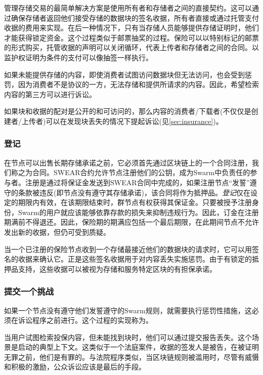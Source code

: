 管理存储交易的最简单解决方案是使用所有者和存储者之间的直接契约。这可以通过确保存储者返回他们接受存储的数据块的签名收据，所有者直接或通过托管支付收据的费用来实现。在后一种情况下，只有当存储人员能够提供存储证明时，他们才能获得锁定资金。这个过程类似于邮票抽奖的过程。保险可以以特别标记的邮票的形式购买，托管收据的声明可以关闭循环，代表上传者和存储者之间的合同。以监护权证明为条件的支付可以像抽签一样执行。

如果未能提供存储的内容，即使消费者试图访问数据块但无法访问，也会受到惩罚，因为消费者不是协议的一方，无法存储和提供所请求的内容。因此，希望检索内容的第三方可以进行诉讼。

如果块和收据的配对是公开的和可访问的，那么内容的消费者/下载者(不仅仅是创建者/上传者)可以在发现块丢失的情况下提起诉讼(见\ref{sec:insurance})。 

\subsubsection{登记}

在节点可以出售长期存储承诺之前，它必须首先通过区块链上的一个合同注册，我们称之为合同。SWEAR合约允许节点注册他们的公钥，成为Swarm中负责任的参与者。注册是通过将保证金发送到SWEAR合同中完成的，如果注册节点“发誓”遵守的条款被违反(即节点没有遵守其存储承诺)，该合同将作为抵押品。\emph{登记}仅在设定的期限内有效，在该期限结束时，群节点有权获得其保证金。只要被授予注册身份，Swarm的用户就应该能够依靠存款的损失来抑制违规行为。因此，订金在注册期满前不得退还。因此，保险期的期满应包括一个最后期限，在此期间节点不允许发出新的收据，但仍可受到质疑。

当一个已注册的保险节点收到一个存储最接近他们的数据块的请求时，它可以用签名的收据来确认它。正是这些签名收据用于对内容丢失实施惩罚。由于有锁定的抵押品支持，这些收据可以被视为存储和服务特定区块的有担保承诺。



\subsubsection{提交一个挑战}


如果一个节点没有遵守他们发誓遵守的Swarm规则，就需要执行惩罚性措施，这必须在诉讼程序之前进行。这个过程的实现称为。

当用户试图检索投保内容，但未能找到块时，他们可以通过提交报告丢失。这个场景是启动的典型上下文。这类似于一个法庭案件，收据的签发人是被告，在被证明无罪之前，他们是有罪的。与法院程序类似，当区块链规则被滥用时，尽管有威慑和积极的激励，公众诉讼应该是最后的手段。


